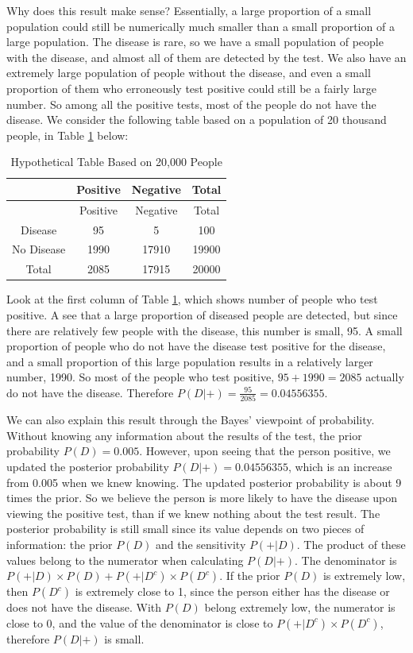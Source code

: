 \documentclass[
]{book}
\begin{document}
Why does this result make sense? Essentially, a large proportion of a small population could still be numerically much smaller than a small proportion of a large population. The disease is rare, so we have a small population of people with the disease, and almost all of them are detected by the test. We also have an extremely large population of people without the disease, and even a small proportion of them who erroneously test positive could still be a fairly large number. So among all the positive tests, most of the people do not have the disease. We consider the following table based on a population of 20 thousand people, in Table \ref{tab:disease} below:

\begin{longtable}[]{@{}cccc@{}}
\caption{\label{tab:disease} Hypothetical Table Based on 20,000 People}\tabularnewline
\toprule\noalign{}
& Positive & Negative & Total \\
\midrule\noalign{}
\endfirsthead
\toprule\noalign{}
& Positive & Negative & Total \\
\midrule\noalign{}
\endhead
\bottomrule\noalign{}
\endlastfoot
Disease & 95 & 5 & 100 \\
No Disease & 1990 & 17910 & 19900 \\
Total & 2085 & 17915 & 20000 \\
\end{longtable}

Look at the first column of Table \ref{tab:disease}, which shows number of people who test positive. A see that a large proportion of diseased people are detected, but since there are relatively few people with the disease, this number is small, 95. A small proportion of people who do not have the disease test positive for the disease, and a small proportion of this large population results in a relatively larger number, 1990. So most of the people who test positive, \(95 + 1990 = 2085\) actually do not have the disease. Therefore \(P(D|+) = \frac{95}{2085} = 0.04556355\).

We can also explain this result through the Bayes' viewpoint of probability. Without knowing any information about the results of the test, the prior probability \(P(D) = 0.005\). However, upon seeing that the person positive, we updated the posterior probability \(P(D|+) = 0.04556355\), which is an increase from 0.005 when we knew knowing. The updated posterior probability is about 9 times the prior. So we believe the person is more likely to have the disease upon viewing the positive test, than if we knew nothing about the test result. The posterior probability is still small since its value depends on two pieces of information: the prior \(P(D)\) and the sensitivity \(P(+|D)\). The product of these values belong to the numerator when calculating \(P(D|+)\). The denominator is \(P(+|D) \times P(D) + P(+|D^c) \times P(D^c)\). If the prior \(P(D)\) is extremely low, then \(P(D^c)\) is extremely close to 1, since the person either has the disease or does not have the disease. With \(P(D)\) belong extremely low, the numerator is close to 0, and the value of the denominator is close to \(P(+|D^c) \times P(D^c)\), therefore \(P(D|+)\) is small.
\end{document}
